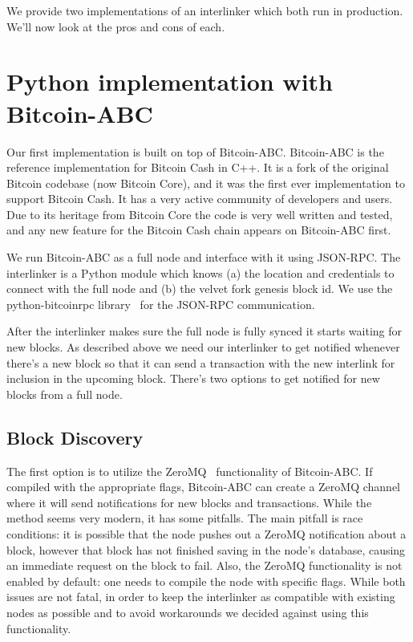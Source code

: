 We provide two implementations of an interlinker which both run in production. We'll now look at the pros and cons of each.

\section{Python implementation with Bitcoin-ABC}
Our first implementation is built on top of Bitcoin-ABC. Bitcoin-ABC is the reference implementation for Bitcoin Cash in C++. It is a fork of the original Bitcoin codebase (now Bitcoin Core), and it was the first ever implementation to support Bitcoin Cash. It has a very active community of developers and users. Due to its heritage from Bitcoin Core the code is very well written and tested, and any new feature for the Bitcoin Cash chain appears on Bitcoin-ABC first.

We run Bitcoin-ABC as a full node and interface with it using JSON-RPC. The interlinker is a Python module which knows (a) the location and credentials to connect with the full node and (b) the velvet fork genesis block id. We use the python-bitcoinrpc library~\cite{python-bitcoinrpc} for the JSON-RPC communication.

After the interlinker makes sure the full node is fully synced it starts waiting for new blocks. As described above we need our interlinker to get notified whenever there's a new block so that it can send a transaction with the new interlink for inclusion in the upcoming block. There's two options to get notified for new blocks from a full node.

\subsection{Block Discovery}

The first option is to utilize the ZeroMQ~\cite{zmq} functionality of Bitcoin-ABC. If compiled with the appropriate flags, Bitcoin-ABC can create a ZeroMQ channel where it will send notifications for new blocks and transactions. While the method seems very modern, it has some pitfalls. The main pitfall is race conditions: it is possible that the node pushes out a ZeroMQ notification about a block, however that block has not finished saving in the node's database, causing an immediate  request on the block to fail. Also, the ZeroMQ functionality is not enabled by default: one needs to compile the node with specific flags. While both issues are not fatal, in order to keep the interlinker as compatible with existing nodes as possible and to avoid workarounds we decided against using this functionality.

